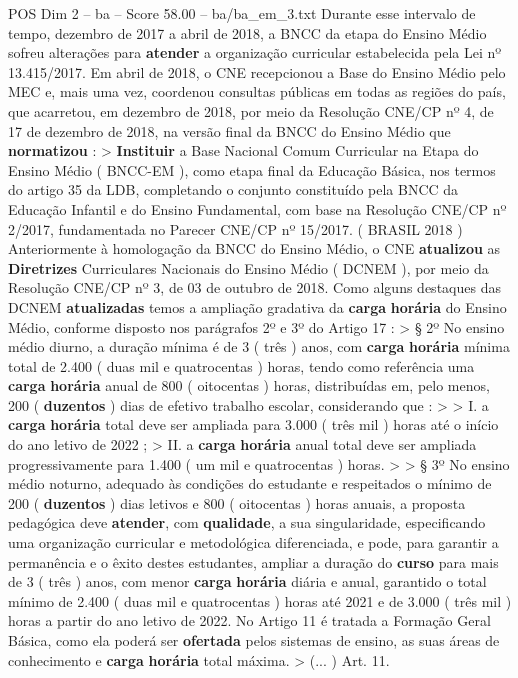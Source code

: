 \begin{textsample}{POS Dim 2 – ba – Score 58.00 – ba/ba\_em\_3.txt}
Durante esse intervalo de tempo, dezembro de 2017 a abril de 2018, a BNCC da etapa do Ensino Médio sofreu alterações para \textbf{atender} a organização curricular estabelecida pela Lei nº 13.415/2017.
Em abril de 2018, o CNE recepcionou a Base do Ensino Médio pelo MEC e, mais uma vez, coordenou consultas públicas em todas as regiões do país, que acarretou, em dezembro de 2018, por meio da Resolução CNE/CP nº 4, de 17 de dezembro de 2018, na versão final da BNCC do Ensino Médio que \textbf{normatizou} : > \textbf{Instituir} a Base Nacional Comum Curricular na Etapa do Ensino Médio ( BNCC-EM ), como etapa final da Educação Básica, nos termos do artigo 35 da LDB, completando o conjunto constituído pela BNCC da Educação Infantil e do Ensino Fundamental, com base na Resolução CNE/CP nº 2/2017, fundamentada no Parecer CNE/CP nº 15/2017. ( BRASIL 2018 ) Anteriormente à homologação da BNCC do Ensino Médio, o CNE \textbf{atualizou} as \textbf{Diretrizes} Curriculares Nacionais do Ensino Médio ( DCNEM ), por meio da Resolução CNE/CP nº 3, de 03 de outubro de 2018.
Como alguns destaques das DCNEM \textbf{atualizadas} temos a ampliação gradativa da \textbf{carga} \textbf{horária} do Ensino Médio, conforme disposto nos parágrafos 2º e 3º do Artigo 17 : > § 2º No ensino médio diurno, a duração mínima é de 3 ( três ) anos, com \textbf{carga} \textbf{horária} mínima total de 2.400 ( duas mil e quatrocentas ) horas, tendo como referência uma \textbf{carga} \textbf{horária} anual de 800 ( oitocentas ) horas, distribuídas em, pelo menos, 200 ( \textbf{duzentos} ) dias de efetivo trabalho escolar, considerando que : > > I. a \textbf{carga} \textbf{horária} total deve ser ampliada para 3.000 ( três mil ) horas até o início do ano letivo de 2022 ; > II. a \textbf{carga} \textbf{horária} anual total deve ser ampliada progressivamente para 1.400 ( um mil e quatrocentas ) horas. > > § 3º No ensino médio noturno, adequado às condições do estudante e respeitados o mínimo de 200 ( \textbf{duzentos} ) dias letivos e 800 ( oitocentas ) horas anuais, a proposta pedagógica deve \textbf{atender}, com \textbf{qualidade}, a sua singularidade, especificando uma organização curricular e metodológica diferenciada, e pode, para garantir a permanência e o êxito destes estudantes, ampliar a duração do \textbf{curso} para mais de 3 ( três ) anos, com menor \textbf{carga} \textbf{horária} diária e anual, garantido o total mínimo de 2.400 ( duas mil e quatrocentas ) horas até 2021 e de 3.000 ( três mil ) horas a partir do ano letivo de 2022.
No Artigo 11 é tratada a Formação Geral Básica, como ela poderá ser \textbf{ofertada} pelos sistemas de ensino, as suas áreas de conhecimento e \textbf{carga} \textbf{horária} total máxima. > (... ) Art. 11.

\end{textsample}
